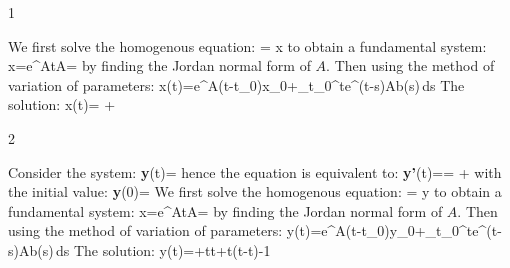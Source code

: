 



\begin{vv286_ms}{1}
\item[]
	We first solve the homogenous equation:
	\eq
	{
	=
				x
	}
	to obtain a fundamental system:
	\eq
	{
	x=e^{At}\quad A=
	}
	by finding the Jordan normal form of $A$.
	Then using the method of variation of parameters:
	\eq
	{
	x(t)=e^{A(t-t_0)}x_0+\int_{t_0}^{t}e^{(t-s)A}b(s)\,ds
	}
	The solution:
	\eq
	{
	x(t)=
	+
	}
\end{vv286_ms}
\begin{vv286_ms}{2}
\item[]
	Consider the system:
	\eq
	{
	{\bf y}(t)=
	}
	hence the equation is equivalent to:
	\eq
	{
	{\bf y'}(t)==
												+
	}
	with the initial value:
	\eq
	{
	{\bf y}(0)=
	}
	We first solve the homogenous equation:
	\eq
	{
	=
				y
	}
	to obtain a fundamental system:
	\eq
	{
	x=e^{At}\quad A=
	}
	by finding the Jordan normal form of $A$.
	Then using the method of variation of parameters:
	\eq
	{
	y(t)=e^{A(t-t_0)}y_0+\int_{t_0}^{t}e^{(t-s)A}b(s)\,ds
	}
	The solution:
	\eq
	{
	y(t)=+\cos  t\ln\cos t+\sin t(t-\tan t)-1
	}
\end{vv286_ms}
